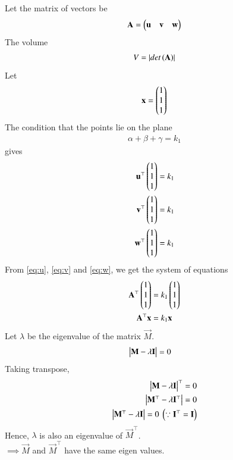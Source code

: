 \documentclass[journal]{IEEEtran}
\begin{document}
Let the matrix of vectors be 
\begin{align}
	\mathbf{A} = \begin{pmatrix}\mathbf{u} & \mathbf{v} & \mathbf{w}\end{pmatrix}
\end{align}
The volume 
\begin{align}
V = \left\vert det\left(\mathbf{A}\right)\right\vert
\end{align}
Let 
\begin{align*}
\mathbf{x} = \begin{pmatrix}1 \\ 1 \\ 1\end{pmatrix}
\end{align*}
The condition that the points lie on the plane 
\begin{align}
	\alpha+\beta+\gamma=k_1
\end{align} gives
\begin{align}
	\mathbf{u}^\top\begin{pmatrix}1 \\ 1 \\ 1\end{pmatrix} &= k_1 \label{eq:u} \\
	\mathbf{v}^\top\begin{pmatrix}1 \\ 1 \\ 1\end{pmatrix} &= k_1 \label{eq:v} \\
	\mathbf{w}^\top\begin{pmatrix}1 \\ 1 \\ 1\end{pmatrix} &= k_1 \label{eq:w}
\end{align}
From \eqref{eq:u}, \eqref{eq:v} and \eqref{eq:w}, we get the system of equations
\begin{align}
    \mathbf{A}^\top\begin{pmatrix}1 \\ 1 \\ 1\end{pmatrix} &= k_1\begin{pmatrix}1 \\ 1 \\ 1\end{pmatrix} \\
    \mathbf{A}^\top\mathbf{x} &= k_1\mathbf{x} \label{eq:eigen}
\end{align}
Let $\lambda$ be the eigenvalue of the matrix $\vec{M}$.
\begin{align}
	\begin{vmatrix}\mathbf{M}-\lambda\mathbf{I}\end{vmatrix} &= 0
\end{align}
Taking transpose,
\begin{align}
	\begin{vmatrix}\mathbf{M}-\lambda\mathbf{I}\end{vmatrix}^\top = 0 \\
	\begin{vmatrix}\mathbf{M}^\top-\lambda\mathbf{I}^\top\end{vmatrix} = 0 \\
	\begin{vmatrix}\mathbf{M}^\top-\lambda\mathbf{I}\end{vmatrix} = 0\text{ }\left(\because \mathbf{I}^\top=\mathbf{I}\right)
\end{align}
Hence, $\lambda$ is also an eigenvalue of $\vec{M}^\top$. \\
$\implies \vec{M}$ and $\vec{M}^\top$ have the same eigen values. \\
\end{document}

